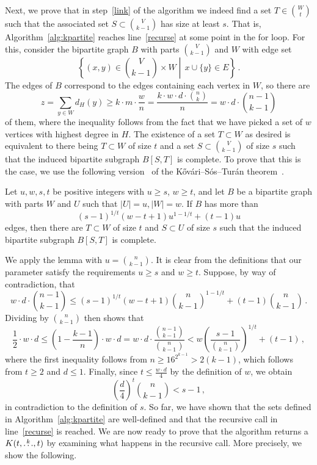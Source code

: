 Next, we prove that in step~\ref{link} of the algorithm
we indeed find a set $T \in \binom{W}{t}$ such that the associated set
$S \subset \binom{V}{k-1}$ has size at least $s$.
That is, Algorithm~\ref{alg:kpartite} reaches line~\ref{recurse} at some point in the for loop.
For this, consider the bipartite graph $B$ with parts $\binom{V}{k-1}$ and $W$ with edge set
\[
  \left\{(x, y) \in \binom{V}{k-1} \times W \middle| \, x \cup \{y\} \in E \right\}\,.
\]
The edges of $B$ correspond to the edges containing each vertex in $W$, so there are
\[
    z = \sum_{y \in W} d_H(y) \geq k \cdot m \cdot \frac{w}{n} = \frac{k \cdot w \cdot d \cdot \binom{n}{k}}{n} = w \cdot d \cdot \binom{n - 1}{k-1}
\]
of them, where the inequality follows from the fact that we have picked a set of $w$ vertices with highest degree in $H$.
The existence of a set $T \subset W$ as desired is equivalent to there being $T \subset W$ of size $t$ and a set $S \subset \binom{V}{k-1}$ of size $s$
such that the induced bipartite subgraph $B[S, T]$ is complete.
To prove that this is the case,
we use the following version~\cite{Hylten1958} of the Kőv\'{a}ri–S\'{o}s–Tur\'{a}n theorem~\cite{Kovari1954}.

\begin{lemma}\label{thm:kst}
    Let $u, w, s, t$ be positive integers with $u \geq s$, $w \geq t$, and let $B$ be a bipartite graph with parts $W$ and $U$ such that
    $|U| = u, |W| = w$.
    If $B$ has more than \[(s - 1)^{1 / t}(w - t + 1)u^{1 - 1 / t} + (t - 1)u\] edges, then there are
    $T \subset W$ of size $t$ and $S \subset U$ of size $s$ such that the induced bipartite subgraph $B[S, T]$ is complete.
\end{lemma}

We apply the lemma with $u = \binom{n}{k-1}$.
It is clear from the definitions that our parameter satisfy the requirements $u \geq s$ and $w \geq t$.
Suppose, by way of contradiction, that
\[
    w \cdot d \cdot \binom{n - 1}{k-1} \leq (s - 1)^{1 / t}(w - t + 1)\binom{n}{k-1}^{1 - 1 / t} + (t - 1)\binom{n}{k-1}\,.
\]
Dividing by $\binom{n}{k-1}$ then shows that
\[
    \frac{1}{2} \cdot w \cdot d
    \leq \left( 1 - \frac{k-1}{n}\right) \cdot w \cdot d
    = w \cdot d \cdot \frac{\binom{n-1}{k-1}}{\binom{n}{k-1}}
    < w \left( \frac{s-1}{\binom{n}{k-1} } \right)^{1 / t} + (t - 1)\,,
\]
where the first inequality follows from $n \geq 16^{2^{k-1}} > 2(k-1)$, which follows from $t \geq 2$ and $d \leq 1$.
Finally, since $t \leq \frac{w \cdot d}{4}$ by the definition of $w$, we obtain
\[
    \left( \frac{d}{4}\right)^t \binom{n}{k-1} < s-1\,,
\]
in contradiction to the definition of $s$.
So far, we have shown that the sets defined in Algorithm~\ref{alg:kpartite}
are well-defined and that the recursive call in line~\ref{recurse} is reached.
We are now ready to prove that the algorithm returns a $K(t, \overset{k}{\dots}, t)$
by examining what happens in the recursive call.
More precisely, we show the following.

